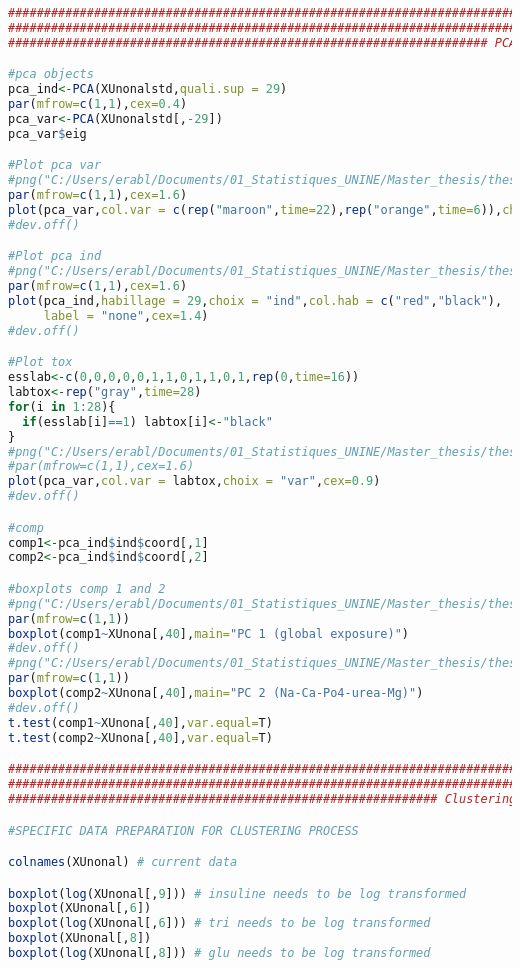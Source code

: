 \documentclass[a4paper]{book}
\begin{document}
\begin{lstlisting}[language=R]
#######################################################################
#######################################################################
################################################################### PCA

#pca objects
pca_ind<-PCA(XUnonalstd,quali.sup = 29)
par(mfrow=c(1,1),cex=0.4)
pca_var<-PCA(XUnonalstd[,-29])
pca_var$eig

#Plot pca var
#png("C:/Users/erabl/Documents/01_Statistiques_UNINE/Master_thesis/thesis/figures/pca_var.png",width = 790,height = 790)
par(mfrow=c(1,1),cex=1.6)
plot(pca_var,col.var = c(rep("maroon",time=22),rep("orange",time=6)),choix = "var",cex=0.9)
#dev.off()

#Plot pca ind
#png("C:/Users/erabl/Documents/01_Statistiques_UNINE/Master_thesis/thesis/figures/pca_ind.png",width = 790,height = 790)
par(mfrow=c(1,1),cex=1.6)
plot(pca_ind,habillage = 29,choix = "ind",col.hab = c("red","black"),
     label = "none",cex=1.4)
#dev.off()

#Plot tox
esslab<-c(0,0,0,0,0,1,1,0,1,1,0,1,rep(0,time=16))
labtox<-rep("gray",time=28)
for(i in 1:28){
  if(esslab[i]==1) labtox[i]<-"black"
}
#png("C:/Users/erabl/Documents/01_Statistiques_UNINE/Master_thesis/thesis/figures/pca_toxic.png",width = 790,height = 790)
#par(mfrow=c(1,1),cex=1.6)
plot(pca_var,col.var = labtox,choix = "var",cex=0.9)
#dev.off()

#comp
comp1<-pca_ind$ind$coord[,1]
comp2<-pca_ind$ind$coord[,2]

#boxplots comp 1 and 2
#png("C:/Users/erabl/Documents/01_Statistiques_UNINE/Master_thesis/thesis/figures/PC1scores.png",width = 404,height = 404)
par(mfrow=c(1,1))
boxplot(comp1~XUnona[,40],main="PC 1 (global exposure)")
#dev.off()
#png("C:/Users/erabl/Documents/01_Statistiques_UNINE/Master_thesis/thesis/figures/PC2scores.png",width = 404,height = 404)
par(mfrow=c(1,1))
boxplot(comp2~XUnona[,40],main="PC 2 (Na-Ca-Po4-urea-Mg)")
#dev.off()
t.test(comp1~XUnona[,40],var.equal=T)
t.test(comp2~XUnona[,40],var.equal=T)

#######################################################################
#######################################################################
############################################################ Clustering

#SPECIFIC DATA PREPARATION FOR CLUSTERING PROCESS

colnames(XUnonal) # current data

boxplot(log(XUnonal[,9])) # insuline needs to be log transformed
boxplot(XUnonal[,6])
boxplot(log(XUnonal[,6])) # tri needs to be log transformed
boxplot(XUnonal[,8])
boxplot(log(XUnonal[,8])) # glu needs to be log transformed


\end{lstlisting}
\end{document}
